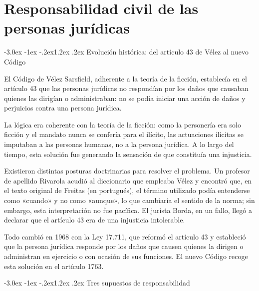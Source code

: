 \documentclass[12pt,oneside]{book}
\makeatletter
\renewcommand\section{\@startsection{section}{1}{\z@}%
  {-3.0ex \@plus -1ex \@minus -.2ex}{1.2ex \@plus .2ex}%
  {\normalfont\large\bfseries\color{acento}}}
\makeatother
\begin{document}

\chapter{Responsabilidad civil de las personas jurídicas}

\section{Evolución histórica: del artículo 43 de Vélez al nuevo Código}

El Código de Vélez Sarsfield, adherente a la teoría de la ficción, establecía en el artículo 43 que las personas jurídicas no respondían por los daños que causaban quienes las dirigían o administraban: no se podía iniciar una acción de daños y perjuicios contra una persona jurídica.

La lógica era coherente con la teoría de la ficción: como la personería era solo ficción y el mandato nunca se confería para el ilícito, las actuaciones ilícitas se imputaban a las personas humanas, no a la persona jurídica. A lo largo del tiempo, esta solución fue generando la sensación de que constituía una injusticia.

Existieron distintas posturas doctrinarias para resolver el problema. Un profesor de apellido Rivarola acudió al diccionario que empleaba Vélez y encontró que, en el texto original de Freitas (en portugués), el término utilizado podía entenderse como «cuando» y no como «aunque», lo que cambiaría el sentido de la norma; sin embargo, esta interpretación no fue pacífica. El jurista Borda, en un fallo, llegó a declarar que el artículo 43 era de una injusticia intolerable.

\begin{importante}
Todo cambió en 1968 con la Ley 17.711, que reformó el artículo 43 y estableció que la persona jurídica responde por los daños que causen quienes la dirigen o administran en ejercicio o con ocasión de sus funciones. El nuevo Código recoge esta solución en el artículo 1763.
\end{importante}

\section{Tres supuestos de responsabilidad}
\end{document}
